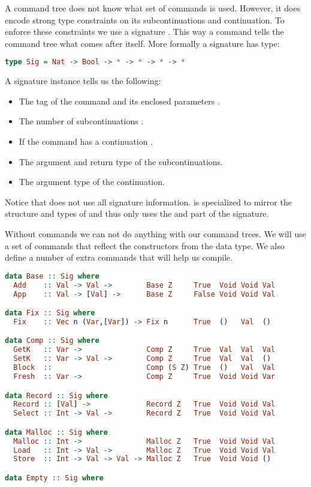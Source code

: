 A command tree does not know what set of commands is used. However, it does encode strong type constraints on its subcontinuations and continuation. To enforce these constraints we use a signature . This way a command tells the command tree what comes after itself. More formally a signature has type:

\begin{lstlisting}[language=Haskell]
type Sig = Nat -> Bool -> * -> * -> * -> *
\end{lstlisting}

A signature instance  tells us the following:

\begin{itemize}
\item The tag of the command and its enclosed parameters .
\item The number of subcontinuations .
\item If the command has a continuation .
\item The argument  and return type  of the subcontinuations.
\item The argument type  of the continuation.
\end{itemize}

Notice that  does not use all signature information.  is specialized to mirror the structure and types of  and thus only uses the  and  part of the signature.

Without commands we can not do anything with our command trees. We will use a set of commands that reflect the constructors from the  data type. We also define a number of extra commands that will help us compile.

\begin{lstlisting}[language=Haskell]
data Base :: Sig where
  Add    :: Val -> Val ->        Base Z     True  Void Void Val
  App    :: Val -> [Val] ->      Base Z     False Void Void Val

data Fix :: Sig where
  Fix    :: Vec n (Var,[Var]) -> Fix n      True  ()   Val  ()

data Comp :: Sig where
  GetK   :: Var ->               Comp Z     True  Val  Val  Val
  SetK   :: Var -> Val ->        Comp Z     True  Val  Val  ()
  Block  ::                      Comp (S Z) True  ()   Val  Val
  Fresh  :: Var ->               Comp Z     True  Void Void Var

data Record :: Sig where
  Record :: [Val] ->             Record Z   True  Void Void Val
  Select :: Int -> Val ->        Record Z   True  Void Void Val

data Malloc :: Sig where
  Malloc :: Int ->               Malloc Z   True  Void Void Val
  Load   :: Int -> Val ->        Malloc Z   True  Void Void Val
  Store  :: Int -> Val -> Val -> Malloc Z   True  Void Void ()

data Empty :: Sig where
\end{lstlisting}

